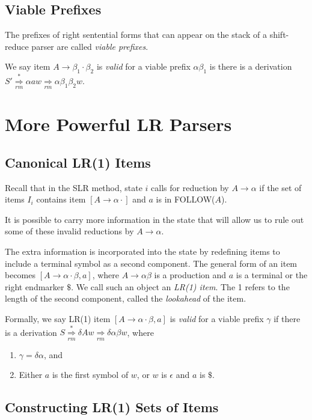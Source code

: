 \documentclass[12pt,a4paper,twoside,openany]{book}
\begin{document}
\subsection{Viable Prefixes}

The prefixes of right sentential forms that can appear on the stack of a shift-reduce parser are called \textit{viable prefixes}.

We say item $A\rightarrow\beta_1\cdot\beta_2$ is \textit{valid} for a viable prefix $\alpha\beta_1$ is there is a derivation $S'\underset{rm}{\overset{*}{\Rightarrow}}\alpha aw\underset{rm}{\Rightarrow}\alpha\beta_1\beta_2w$.

\section{More Powerful LR Parsers}
\subsection{Canonical LR(1) Items}

Recall that in the SLR method, state $i$ calls for reduction by $A\rightarrow\alpha$ if the set of items $I_i$ contains item $[A\rightarrow\alpha\cdot]$ and $a$ is in FOLLOW($A$).

It is possible to carry more information in the state that will allow us to rule out some of these invalid reductions by $A\rightarrow\alpha$.

The extra information is incorporated into the state by redefining items to include a terminal symbol as a second component. The general form of an item becomes $[A\rightarrow\alpha\cdot\beta,a]$, where $A\rightarrow\alpha\beta$ is a production and $a$ is a terminal or the right endmarker $\$$. We call such an object an \textit{LR(1) item}. The 1 refers to the length of the second component, called the \textit{lookahead} of the item.

Formally, we say LR(1) item $[A\rightarrow\alpha\cdot\beta,a]$ is \textit{valid} for a viable prefix $\gamma$ if there is a derivation $S\underset{rm}{\overset{*}{\Rightarrow}}\delta Aw\underset{rm}{\Rightarrow}\delta\alpha\beta w$, where
\begin{enumerate}
    \item $\gamma=\delta\alpha$, and
    \item Either $a$ is the first symbol of $w$, or $w$ is $\epsilon$ and $a$ is $\$$.
\end{enumerate}

\subsection{Constructing LR(1) Sets of Items}
\end{document}
